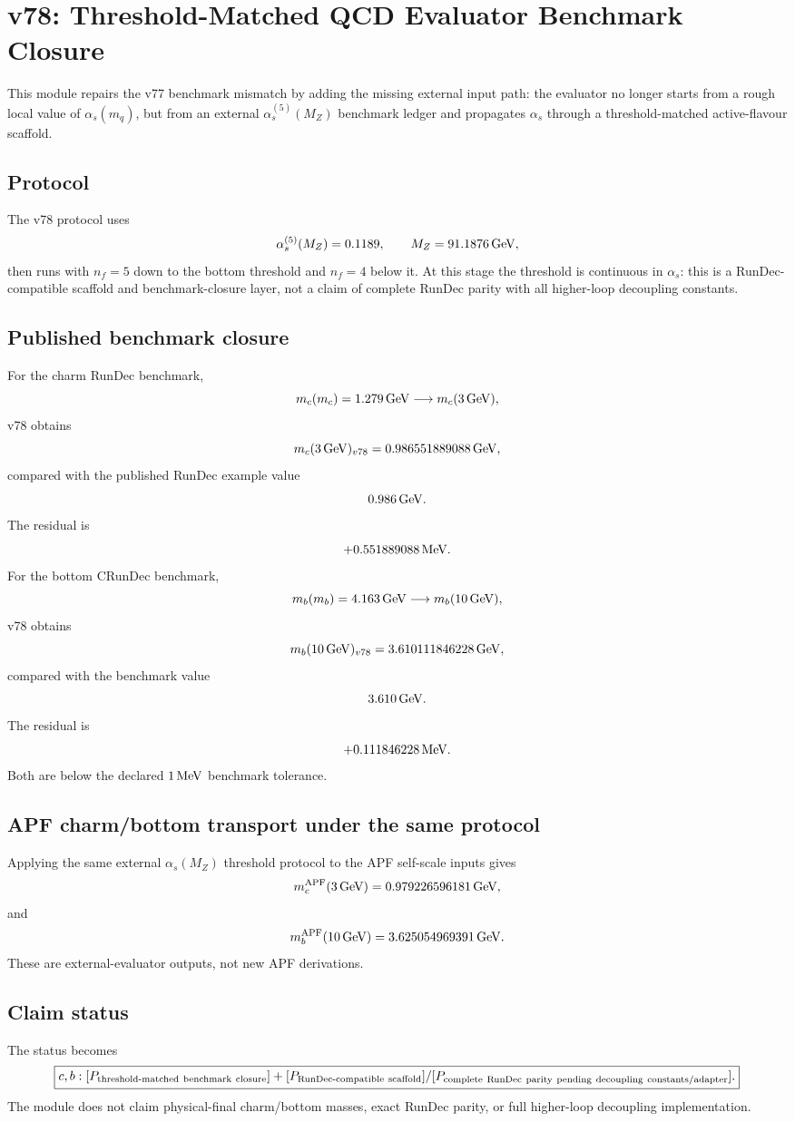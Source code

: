 
\section{v78: Threshold-Matched QCD Evaluator Benchmark Closure}
\label{sec:v78-threshold-matched-qcd}

This module repairs the v77 benchmark mismatch by adding the missing external input path: the evaluator no longer starts from a rough local value of $\alpha_s(m_q)$, but from an external $\alpha_s^{(5)}(M_Z)$ benchmark ledger and propagates $\alpha_s$ through a threshold-matched active-flavour scaffold.

\subsection{Protocol}
The v78 protocol uses
\[
  \alpha_s^{(5)}(M_Z)=0.1189,\qquad M_Z=91.1876\,{\rm GeV},
\]
then runs with $n_f=5$ down to the bottom threshold and $n_f=4$ below it.  At this stage the threshold is continuous in $\alpha_s$: this is a RunDec-compatible scaffold and benchmark-closure layer, not a claim of complete RunDec parity with all higher-loop decoupling constants.

\subsection{Published benchmark closure}
For the charm RunDec benchmark,
\[
  m_c(m_c)=1.279\,{\rm GeV}\longrightarrow m_c(3\,{\rm GeV}),
\]
v78 obtains
\[
  m_c(3\,{\rm GeV})_{v78}=0.986551889088\,{\rm GeV},
\]
compared with the published RunDec example value
\[
  0.986\,{\rm GeV}.
\]
The residual is
\[
  +0.551889088\,{\rm MeV}.
\]
For the bottom CRunDec benchmark,
\[
  m_b(m_b)=4.163\,{\rm GeV}\longrightarrow m_b(10\,{\rm GeV}),
\]
v78 obtains
\[
  m_b(10\,{\rm GeV})_{v78}=3.610111846228\,{\rm GeV},
\]
compared with the benchmark value
\[
  3.610\,{\rm GeV}.
\]
The residual is
\[
  +0.111846228\,{\rm MeV}.
\]
Both are below the declared $1\,{\rm MeV}$ benchmark tolerance.

\subsection{APF charm/bottom transport under the same protocol}
Applying the same external $\alpha_s(M_Z)$ threshold protocol to the APF self-scale inputs gives
\[
  m_c^{\rm APF}(3\,{\rm GeV})=0.979226596181\,{\rm GeV},
\]
and
\[
  m_b^{\rm APF}(10\,{\rm GeV})=3.625054969391\,{\rm GeV}.
\]
These are external-evaluator outputs, not new APF derivations.

\subsection{Claim status}
The status becomes
\[
\boxed{
 c,b:[P_{\rm threshold\text{-}matched\ benchmark\ closure}]
 +[P_{\rm RunDec\text{-}compatible\ scaffold}]
 /[P_{\rm complete\ RunDec\ parity\ pending\ decoupling\ constants/adapter}].
}
\]
The module does not claim physical-final charm/bottom masses, exact RunDec parity, or full higher-loop decoupling implementation.
